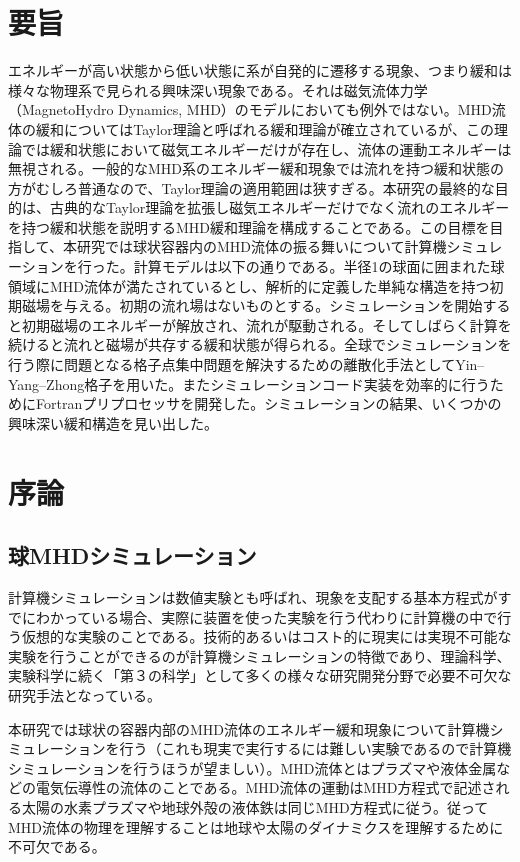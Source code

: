\documentclass[12pt]{jsarticle}
\begin{document}
\section*{要旨}
エネルギーが高い状態から低い状態に系が自発的に遷移する現象、つまり緩和は様々な物理系で見られる興味深い現象である。それは磁気流体力学（MagnetoHydro Dynamics, MHD）のモデルにおいても例外ではない。MHD流体の緩和についてはTaylor理論と呼ばれる緩和理論が確立されているが、この理論では緩和状態において磁気エネルギーだけが存在し、流体の運動エネルギーは無視される。一般的なMHD系のエネルギー緩和現象では流れを持つ緩和状態の方がむしろ普通なので、Taylor理論の適用範囲は狭すぎる。本研究の最終的な目的は、古典的なTaylor理論を拡張し磁気エネルギーだけでなく流れのエネルギーを持つ緩和状態を説明するMHD緩和理論を構成することである。この目標を目指して、本研究では球状容器内のMHD流体の振る舞いについて計算機シミュレーションを行った。計算モデルは以下の通りである。半径1の球面に囲まれた球領域にMHD流体が満たされているとし、解析的に定義した単純な構造を持つ初期磁場を与える。初期の流れ場はないものとする。シミュレーションを開始すると初期磁場のエネルギーが解放され、流れが駆動される。そしてしばらく計算を続けると流れと磁場が共存する緩和状態が得られる。全球でシミュレーションを行う際に問題となる格子点集中問題を解決するための離散化手法としてYin--Yang--Zhong格子を用いた。またシミュレーションコード実装を効率的に行うためにFortranプリプロセッサを開発した。シミュレーションの結果、いくつかの興味深い緩和構造を見い出した。


\newpage
\thispagestyle{empty}
\setcounter{tocdepth}{2}
\tableofcontents
\newpage
\setcounter{page}{1}
\section{序論}
\subsection{球MHDシミュレーション}
計算機シミュレーションは数値実験とも呼ばれ、現象を支配する基本方程式がすでにわかっている場合、実際に装置を使った実験を行う代わりに計算機の中で行う仮想的な実験のことである。技術的あるいはコスト的に現実には実現不可能な実験を行うことができるのが計算機シミュレーションの特徴であり、理論科学、実験科学に続く「第３の科学」として多くの様々な研究開発分野で必要不可欠な研究手法となっている\cite{プラズマシミュレーション}。

本研究では球状の容器内部のMHD流体のエネルギー緩和現象について計算機シミュレーションを行う（これも現実で実行するには難しい実験であるので計算機シミュレーションを行うほうが望ましい）。MHD流体とはプラズマや液体金属などの電気伝導性の流体のことである。MHD流体の運動はMHD方程式で記述される太陽の水素プラズマや地球外殻の液体鉄\cite{地球ダイナモ研究のこれまでとこれから}は同じMHD方程式に従う。従ってMHD流体の物理を理解することは地球や太陽のダイナミクスを理解するために不可欠である。
\end{document}
